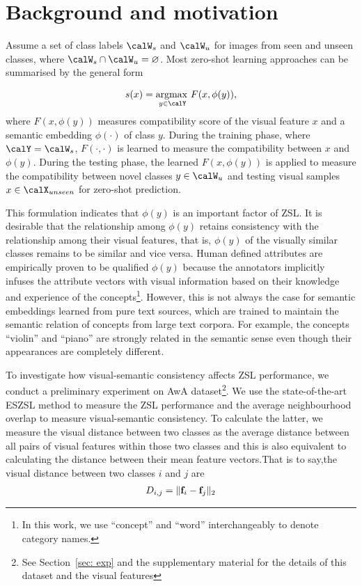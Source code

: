 \documentclass{bmvc2k}
\begin{document}
\section{Background and motivation}
\label{sec: bg}

Assume a set of class labels $\calW_s$ and $\calW_u$ for images from seen and unseen classes, where $\calW_s \cap \calW_u = \varnothing$. Most zero-shot learning approaches can be summarised by the general form

\begin{align}\label{eq:formulation}
 s(x) = \argmax_{y \in \calY} {F(x, \phi(y))},
\end{align}
where $F(x, \phi(y))$ measures compatibility score of the visual feature $x$ and a semantic embedding $\phi(\cdot)$ of class $y$. During the training phase, where $\calY = \calW_s$, $F(\cdot, \cdot)$ is learned to measure the compatibility between $x$ and $\phi(y)$. During the testing phase, the learned $F(x, \phi(y))$ is applied to measure the compatibility between novel classes $y \in \calW_u$ and testing visual samples  $x \in \calX_{unseen}$ for zero-shot prediction.

This formulation indicates that $\phi(y)$ is an important factor of ZSL. It is desirable that the relationship among $\phi(y)$ retains consistency with the relationship among their visual features, that is, $\phi(y)$ of the visually similar classes remains to be similar and vice versa. Human defined attributes are empirically proven to be qualified $\phi(y)$ because the annotators implicitly infuses the attribute vectors with visual information based on their knowledge and experience of the concepts\footnote{In this work, we use ``concept'' and ``word'' interchangeably to denote category names.}. However, this is not always the case for semantic embeddings learned from pure text sources, which are trained to maintain the semantic relation of concepts from large text corpora.  For example, the concepts ``violin'' and ``piano'' are strongly related in the semantic sense even though their appearances are completely different.

To investigate how visual-semantic consistency affects ZSL performance, we conduct a preliminary experiment on AwA dataset\footnote{See Section~\ref{sec: exp} and the supplementary material for the details of this dataset and the visual features}. We use the state-of-the-art ESZSL \cite{Romera2015ZSL} method to measure the ZSL performance and the average neighbourhood overlap to measure visual-semantic consistency. To calculate the latter, we measure the visual distance between two classes as the average distance between all pairs of visual features within those two classes and this is also equivalent to calculating the distance between their mean feature vectors.That is to say,the visual distance between two classes $i$ and $j$ are
\begin{align}\label{eq:vdist}
 D_{i,j} = \|{\bf f}_i - {\bf f}_j \|_2
\end{align}
\end{document}
